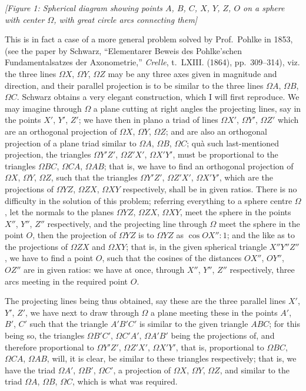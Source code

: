 \documentclass[11pt,a4paper]{book}
\begin{document}
\begin{center}
\textit{[Figure 1: Spherical diagram showing points $A$, $B$, $C$, $X$, $Y$, $Z$, $O$ on a sphere with center $\Omega$, with great circle arcs connecting them]}
\end{center}

This is in fact a case of a more general problem solved by Prof.~Pohlke in 1853, (see the paper by Schwarz, ``Elementarer Beweis des Pohlke'schen Fundamentalsatzes der Axonometrie,'' \textit{Crelle}, t.~LXIII. (1864), pp.~309--314), viz. the three lines $\Omega X$, $\Omega Y$, $\Omega Z$ may be any three axes given in magnitude and direction, and their parallel projection is to be similar to the three lines $\Omega A$, $\Omega B$, $\Omega C$. Schwarz obtains a very elegant construction, which I will first reproduce. We may imagine through $\Omega$ a plane cutting at right angles the projecting lines, say in the points $X'$, $Y'$, $Z'$; we have then in plano a triad of lines $\Omega X'$, $\Omega Y'$, $\Omega Z'$ which are an orthogonal projection of $\Omega X$, $\Omega Y$, $\Omega Z$; and are also an orthogonal projection of a plane triad similar to $\Omega A$, $\Omega B$, $\Omega C$; qu\`{a} such last-mentioned projection, the triangles $\Omega Y'Z'$, $\Omega Z'X'$, $\Omega X'Y'$, must be proportional to the triangles $\Omega BC$, $\Omega CA$, $\Omega AB$; that is, we have to find an orthogonal projection of $\Omega X$, $\Omega Y$, $\Omega Z$, such that the triangles $\Omega Y'Z'$, $\Omega Z'X'$, $\Omega X'Y'$, which are the projections of $\Omega YZ$, $\Omega ZX$, $\Omega XY$ respectively, shall be in given ratios. There is no difficulty in the solution of this problem; referring everything to a sphere centre $\Omega$, let the normals to the planes $\Omega YZ$, $\Omega ZX$, $\Omega XY$, meet the sphere in the points $X''$, $Y''$, $Z''$ respectively, and the projecting line through $\Omega$ meet the sphere in the point $O$, then the projection of $\Omega YZ$ is to $\Omega YZ$ as $\cos OX'' : 1$; and the like as to the projections of $\Omega ZX$ and $\Omega XY$; that is, in the given spherical triangle $X''Y''Z''$, we have to find a point $O$, such that the cosines of the distances $OX''$, $OY''$, $OZ''$ are in given ratios: we have at once, through $X''$, $Y''$, $Z''$ respectively, three arcs meeting in the required point $O$.

The projecting lines being thus obtained, say these are the three parallel lines $X'$, $Y'$, $Z'$, we have next to draw through $\Omega$ a plane meeting these in the points $A'$, $B'$, $C'$ such that the triangle $A'B'C'$ is similar to the given triangle $ABC$; for this being so, the triangles $\Omega B'C'$, $\Omega C'A'$, $\Omega A'B'$ being the projections of, and therefore proportional to $\Omega Y'Z'$, $\Omega Z'X'$, $\Omega X'Y'$, that is, proportional to $\Omega BC$, $\Omega CA$, $\Omega AB$, will, it is clear, be similar to these triangles respectively; that is, we have the triad $\Omega A'$, $\Omega B'$, $\Omega C'$, a projection of $\Omega X$, $\Omega Y$, $\Omega Z$, and similar to the triad $\Omega A$, $\Omega B$, $\Omega C$, which is what was required.
\end{document}
